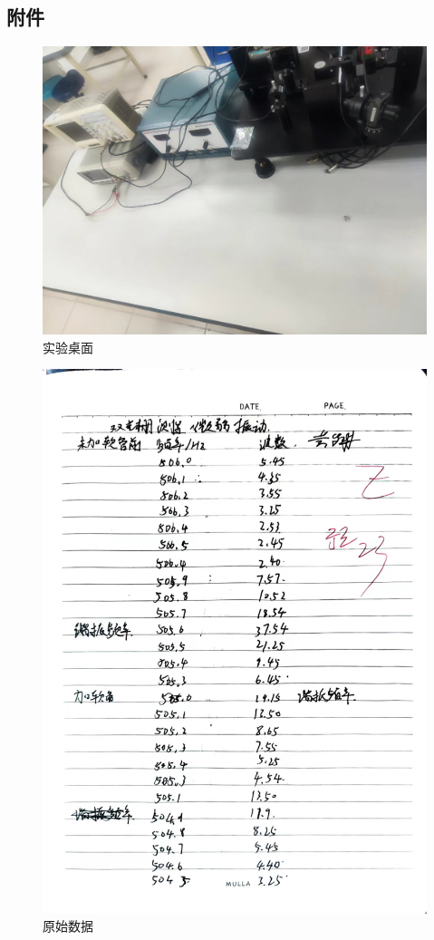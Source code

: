 \documentclass[dvipsnames, svgnames,a4paper,11pt]{article}
\begin{document}
	
	
	\subsection{附件}
	\begin{figure}[H]
		\centering
		\includegraphics[width=0.4\linewidth]{images/桌面}
		\caption{实验桌面}
		\label{}
	\end{figure}
	\begin{figure}[H]
		\centering
		\includegraphics[width=0.3\linewidth]{images/原始数据}
		\caption{原始数据}
		\label{}
	\end{figure}
	
	
\end{document}
